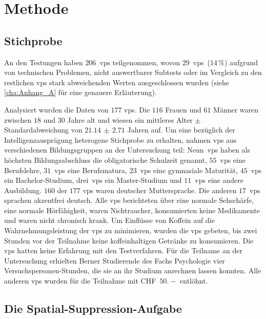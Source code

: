 \documentclass[11pt, twoside, a4paper]{book}		%
\begin{document}
\chapter{Methode \label{cha:Methode}}

\section{Stichprobe \label{sec:Stichprobe}}

An den Testungen haben $206$~\glspl{vp} teilgenommen, wovon $29$~\glspl{vp}~($14\,\%$) aufgrund von technischen Problemen, nicht auswertbarer Subtests oder im Vergleich zu den restlichen \glspl{vp} stark abweichenden Werten ausgeschlossen wurden (siehe \autoref{cha:Anhang_A} für eine genauere Erläuterung).

Analysiert wurden die Daten von $177$ \glspl{vp}. Die $116$ Frauen und $61$ Männer waren zwischen $18$ und $30$ Jahre alt und wiesen ein mittleres Alter $\pm$ Standardabweichung von $21.14\,\pm\,2.71$ Jahren auf. 
Um eine bezüglich der Intelligenzausprägung heterogene Stichprobe zu erhalten, nahmen \glspl{vp} aus verschiedenen Bildungsgruppen an der Untersuchung teil:
Neun~\glspl{vp} haben als höchsten Bildungsabschluss die obligatorische Schulzeit genannt,
$55$~\glspl{vp} eine Berufslehre,
$31$~\glspl{vp} eine Berufsmatura,
$23$~\glspl{vp} eine gymnasiale Maturität,
$45$~\glspl{vp} ein Bachelor-Studium,
drei~\glspl{vp} ein Master-Studium und 
$11$~\glspl{vp} eine andere Ausbildung.
$160$ der $177$ \glspl{vp} waren deutscher Muttersprache. Die anderen $17$~\glspl{vp} sprachen akzentfrei deutsch. Alle \glspl{vp} berichteten über eine normale Sehschärfe, eine normale Hörfähigkeit, waren Nichtraucher, konsumierten keine Medikamente und waren nicht chronisch krank. Um Einflüsse von Koffein auf die Wahrnehmungsleistung \citep[][]{Stough1995} der \glspl{vp} zu minimieren, wurden die \glspl{vp} gebeten, bis zwei Stunden vor der Teilnahme keine koffeinhaltigen Getränke zu konsumieren. Die \glspl{vp} hatten keine Erfahrung mit den Testverfahren. 
Für die Teilname an der Untersuchung erhielten Berner Studierende des Fachs Psychologie vier Ver\-suchs\-per\-sonen-Stun\-den, die sie an ihr Studium anrechnen lassen konnten. Alle anderen \glspl{vp} wurden für die Teilnahme mit CHF~$50.-$ entlöhnt.

\section{Die Spatial-Suppression-Aufgabe \label{sec:Die_Spatial-Suppression-Aufgabe}}
\end{document}

